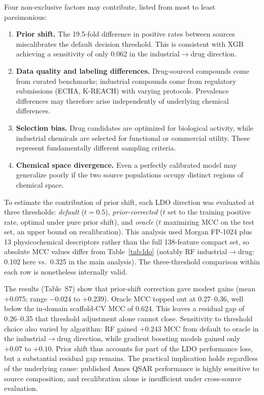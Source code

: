 Four non-exclusive factors may contribute, listed from most to least parsimonious:

\begin{enumerate}
    \item \textbf{Prior shift.} The 19.5-fold difference in positive rates between sources 
    miscalibrates the default decision threshold. This is consistent with XGB achieving a 
    sensitivity of only 0.062 in the industrial$\to$drug direction.

    \item \textbf{Data quality and labeling differences.} Drug-sourced compounds come from 
    curated benchmarks; industrial compounds come from regulatory submissions (ECHA, 
    K-REACH) with varying protocols. Prevalence differences may therefore arise independently 
    of underlying chemical differences.

    \item \textbf{Selection bias.} Drug candidates are optimized for biological activity, 
    while industrial chemicals are selected for functional or commercial utility. These 
    represent fundamentally different sampling criteria.

    \item \textbf{Chemical space divergence.\cite{Lipinski_2004,Veber_2002}} Even a 
    perfectly calibrated model may generalize poorly if the two source populations occupy 
    distinct regions of chemical space.
\end{enumerate}

To estimate the contribution of prior shift, each LDO direction was evaluated at three 
thresholds: \textit{default} ($t = 0.5$), \textit{prior-corrected} ($t$ set to the 
training positive rate, optimal under pure prior shift), and \textit{oracle} ($t$ 
maximizing MCC on the test set, an upper bound on recalibration). This analysis used 
Morgan FP-1024 plus 13 physicochemical descriptors rather than the full 138-feature compact 
set, so absolute MCC values differ from Table~\ref{tab:ldo} (notably RF 
industrial$\to$drug: 0.102 here vs.\ 0.325 in the main analysis). The three-threshold 
comparison within each row is nonetheless internally valid.

The results (Table~S7) show that prior-shift correction gave modest gains (mean $+0.075$; 
range $-0.024$ to $+0.239$). Oracle MCC topped out at 0.27--0.36, well below the in-domain 
scaffold-CV MCC of 0.624. This leaves a residual gap of 0.26--0.35 that threshold 
adjustment alone cannot close. Sensitivity to threshold choice also varied by algorithm: 
RF gained $+0.243$ MCC from default to oracle in the industrial$\to$drug direction, while 
gradient boosting models gained only $+0.07$ to $+0.10$. Prior shift thus accounts for 
part of the LDO performance loss, but a substantial residual gap remains. The practical 
implication holds regardless of the underlying cause: published Ames QSAR performance is highly 
sensitive to source composition, and recalibration alone is insufficient under cross-source 
evaluation.

